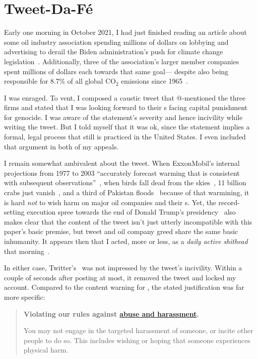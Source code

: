 \section{Tweet-Da-F\'e}
\label{sec:tweet-da-fe}

Early one morning in October 2021, I had just finished reading an article about
some oil industry association spending millions of dollars on lobbying and
advertising to derail the Biden administration's push for climate change
legislation~\cite{Tabuchi2021}. Additionally, three of the association's larger
member companies spent millions of dollars each towards that same goal---%
despite also being responsible for 8.7\% of all global CO$_2$ emissions since
1965~\cite{TaylorWatts2019}.

I was enraged. To vent, I composed a caustic tweet that @-mentioned the three
firms and stated that I was looking forward to their s facing capital
punishment for genocide. I was aware of the statement's severity and hence
incivility while writing the tweet. But I told myself that it was ok, since the
statement implies a formal, legal process that still is practiced in the United
States. I even included that argument in both of my appeals.

I remain somewhat ambivalent about the tweet. When ExxonMobil's internal
projections from 1977 to 2003 ``accurately forecast warming that is consistent
with subsequent observations''~\cite{SupranRahmstorf2023}, when birds fall dead
from the skies~\cite{Dave2022}, 11 billion crabs just
vanish~\cite{Olmstead2022}, and a third of Pakistan floods~\cite{Chughtai2022}
because of that warmining, it is hard \emph{not} to wish harm on major oil
companies and their s. Yet, the record-setting execution spree towards
the end of Donald Trump's
presidency~\cite{Arnsdorf2020,Kovarsky2022,SuebsaengReis2023} also makes clear
that the content of the tweet isn't just utterly incompatible with this paper's
basic premise, but tweet and oil company greed share the same basic inhumanity.
It appears then that I acted, more or less, as a \emph{daily active shithead}
that morning~\cite{Sherman2021}.

In either case, Twitter's \AI\ was not impressed by the tweet's incivility.
Within a couple of seconds after posting at most, it removed the tweet and
locked my account. Compared to the content warning for \DALLE, the stated
justification was far more specific:

\begin{quote}
\openfat\textbf{Violating our rules against
\href{https://web.archive.org/web/20220905021323/https://help.twitter.com/en/rules-and-policies/abusive-behavior}{abuse
and harassment}.}

You may not engage in the targeted harassment of someone, or incite other people
to do so. This includes wishing or hoping that someone experiences physical
harm.\closefat{}
\end{quote}

